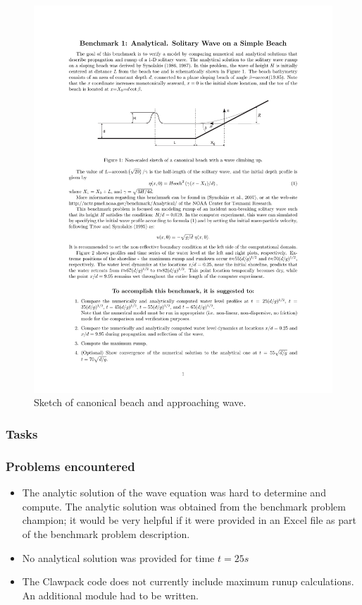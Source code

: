 \begin{figure}[ht]
\hfil\includegraphics[width=5.0in]{bp1/bp1domain}\hfil
\caption{\label{fig:bp1domain} 
Sketch of canonical beach and approaching wave.
 }
\end{figure}

\subsubsection{Tasks}
\begin{itemize}

\end{itemize}

\subsubsection{Problems encountered}

\begin{itemize}
\item The analytic solution of the wave equation was hard to determine and compute.  The analytic solution was obtained from the benchmark problem champion; it would be very helpful if it were provided in an Excel file as part of the benchmark problem description.  
\item No analytical solution was provided for time $t = 25s$
\item The Clawpack code does not currently include maximum runup calculations. An additional module had to be written. 
\end{itemize}

